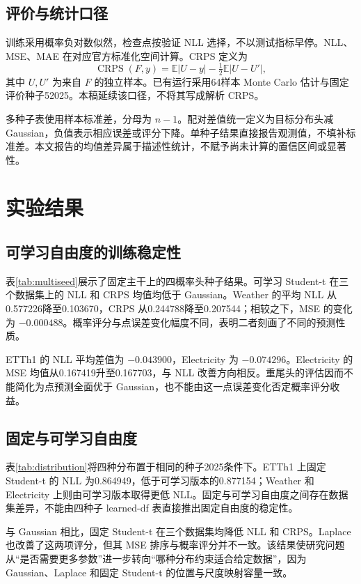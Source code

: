 \documentclass[11pt,a4paper,twocolumn]{article}
\newcommand{\E}{\mathbb{E}}
\begin{document}
\subsection{评价与统计口径}
训练采用概率负对数似然，检查点按验证 NLL 选择，不以测试指标早停。NLL、MSE、MAE 在对应官方标准化空间计算。CRPS 定义为
\begin{equation}
 \operatorname{CRPS}(F,y)=\E|U-y|-\tfrac12\E|U-U'|,
\end{equation}
其中 $U,U'$ 为来自 $F$ 的独立样本。已有运行采用64样本 Monte Carlo 估计与固定评价种子52025。本稿延续该口径，不将其写成解析 CRPS。

多种子表使用样本标准差，分母为 $n-1$。配对差值统一定义为目标分布头减 Gaussian，负值表示相应误差或评分下降。单种子结果直接报告观测值，不填补标准差。本文报告的均值差异属于描述性统计，不赋予尚未计算的置信区间或显著性。

\section{实验结果}
\subsection{可学习自由度的训练稳定性}

表\ref{tab:multiseed}展示了固定主干上的四概率头种子结果。可学习 Student-t 在三个数据集上的 NLL 和 CRPS 均值均低于 Gaussian。Weather 的平均 NLL 从0.577226降至0.103670，CRPS 从0.244788降至0.207544；相较之下，MSE 的变化为 $-0.000488$。概率评分与点误差变化幅度不同，表明二者刻画了不同的预测性质。

ETTh1 的 NLL 平均差值为 $-0.043900$，Electricity 为 $-0.074296$。Electricity 的 MSE 均值从0.167419升至0.167703，与 NLL 改善方向相反。重尾头的评估因而不能简化为点预测全面优于 Gaussian，也不能由这一点误差变化否定概率评分收益。

\subsection{固定与可学习自由度}

表\ref{tab:distribution}将四种分布置于相同的种子2025条件下。ETTh1 上固定 Student-t 的 NLL 为0.864949，低于可学习版本的0.877154；Weather 和 Electricity 上则由可学习版本取得更低 NLL。固定与可学习自由度之间存在数据集差异，不能由四种子 learned-df 表直接推出固定自由度的稳定性。

与 Gaussian 相比，固定 Student-t 在三个数据集均降低 NLL 和 CRPS。Laplace 也改善了这两项评分，但其 MSE 排序与概率评分并不一致。该结果使研究问题从“是否需要更多参数”进一步转向“哪种分布约束适合给定数据”，因为 Gaussian、Laplace 和固定 Student-t 的位置与尺度映射容量一致。
\end{document}
